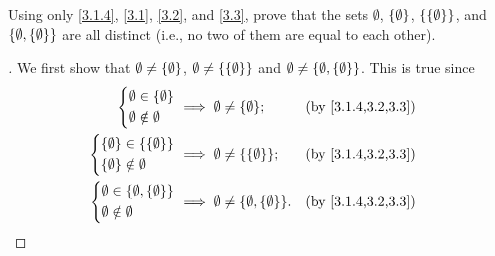 \begin{ex}\label{ex:3.1.2}
  Using only \cref{3.1.4}, \cref{3.1}, \cref{3.2}, and \cref{3.3}, prove that the sets \(\emptyset\), \(\left\lbrace\emptyset\right\rbrace\), \(\left\lbrace\left\lbrace\emptyset\right\rbrace\right\rbrace\), and \(\left\lbrace\emptyset, \left\lbrace\emptyset\right\rbrace\right\rbrace\) are all distinct
  (i.e., no two of them are equal to each other).
\end{ex}

\begin{proof}[]
  We first show that \(\emptyset \neq \left\lbrace\emptyset\right\rbrace\), \(\emptyset \neq \left\lbrace\left\lbrace\emptyset\right\rbrace\right\rbrace\) and \(\emptyset \neq \left\lbrace\emptyset, \left\lbrace\emptyset\right\rbrace\right\rbrace\).
  This is true since
  \begin{align*}
    \begin{dcases}
      \emptyset \in \set{\emptyset} \\
      \emptyset \notin \emptyset
    \end{dcases}                          & \implies \emptyset \neq \set{\emptyset};                  &  & \by{3.1.4,3.2,3.3} \\
    \begin{dcases}
      \set{\emptyset} \in \set{\set{\emptyset}} \\
      \set{\emptyset} \notin \emptyset
    \end{dcases}      & \implies \emptyset \neq \set{\set{\emptyset}};            &  & \by{3.1.4,3.2,3.3}                     \\
    \begin{dcases}
      \emptyset \in \set{\emptyset, \set{\emptyset}} \\
      \emptyset \notin \emptyset
    \end{dcases} & \implies \emptyset \neq \set{\emptyset, \set{\emptyset}}. &  & \by{3.1.4,3.2,3.3}
  \end{align*}


\end{proof}
